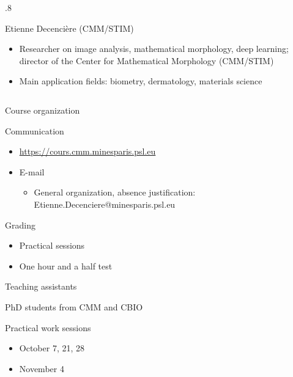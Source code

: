 \documentclass[xcolor=pdftex,dvipsnames,table,mathserif]{beamer}
\begin{document}
{\begin{columns}
\begin{column}{.8\textwidth}
    \begin{block}{Etienne Decencière (CMM/STIM)}
      \scriptsize{
    \begin{itemize}
    \item Researcher on image analysis, mathematical morphology, deep learning; director of the Center for Mathematical Morphology (CMM/STIM)
    \item Main application fields: biometry, dermatology, materials science
    \end{itemize}
    }
  \end{block}

  \end{column}
\end{columns}

}

\begin{frame}{Course organization}

  \begin{block}{Communication}

    \begin{itemize}
  \item \url{https://cours.cmm.minesparis.psl.eu}
  \item E-mail
    \begin{itemize}
    \item General organization, absence justification: Etienne.Decenciere@minesparis.psl.eu
    \end{itemize}
  \end{itemize}

\end{block}

\begin{block}{Grading}

  \begin{itemize}
  \item Practical sessions
  \item One hour and a half test
  \end{itemize}

\end{block}

\end{frame}


\begin{frame}{Teaching assistants}


  \begin{block}{}
    PhD students from CMM and CBIO
  \end{block}

  \begin{block}{Practical work sessions}
  \begin{itemize}
  \item October 7, 21, 28
  \item November 4
  \end{itemize}
  \end{block}

\end{frame}
\end{document}

